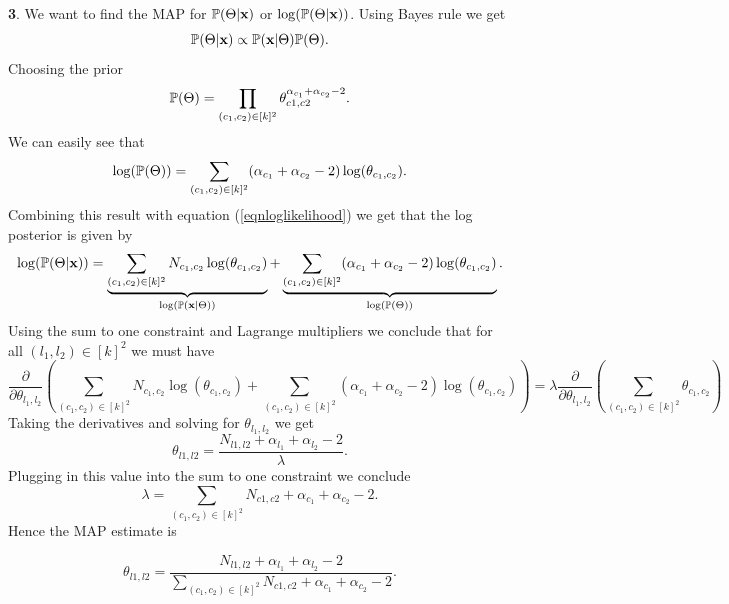 \documentclass{article}
\begin{document}
\textbf{3}. 
\newline
We want to find the MAP for $\mathbb{P}(\Theta|\textbf{x})$ or $\log(\mathbb{P}(\Theta|\textbf{x}))$. Using Bayes rule we get
\begin{equation*}
\mathbb{P}(\Theta|\textbf{x})\propto\mathbb{P}(\textbf{x}|\Theta)\mathbb{P}(\Theta).
\end{equation*}
Choosing the prior 
\begin{equation*}
\mathbb{P}(\Theta)=\prod_{(c_{1},c_{2})\in [k]^{2}}\theta_{c1,c2}^{\alpha_{c_{1}}+\alpha_{c_{2}}-2}.
\end{equation*}
We can easily see that 
\begin{equation*}
\log(\mathbb{P}(\Theta))=\sum_{(c_1,c_2)\in [k]^{2}}(\alpha_{c_{1}}+\alpha_{c_{2}}-2)\log(\theta_{c_1,c_2}).
\end{equation*}
Combining this result with equation (\ref{eqnloglikelihood}) we get that the log posterior is given by
\begin{equation*}
\log(\mathbb{P}(\Theta|\textbf{x}))=\underbrace{\sum_{(c_1,c_2)\in[k]^{2}}N_{c_1,c_2}\log(\theta_{c_1,c_2})}_{\log(\mathbb{P}(\textbf{x}|\Theta))}+
\underbrace{\sum_{(c_1,c_2)\in [k]^{2}}(\alpha_{c_{1}}+\alpha_{c_{2}}-2)\log(\theta_{c_1,c_2})}_{\log(\mathbb{P}(\Theta))}.
\end{equation*}
Using the sum to one constraint and Lagrange multipliers we conclude that for all $(l_{1},l_{2})\in [k]^{2}$ we must  have
\begin{equation*}
\frac{\partial}{\partial\theta_{l_1,l_2}}(\sum_{(c_1,c_2)\in[k]^{2}}N_{c_1,c_2}\log(\theta_{c_1,c_2})+
\sum_{(c_1,c_2)\in [k]^{2}}(\alpha_{c_{1}}+\alpha_{c_{2}}-2)\log(\theta_{c_1,c_2}))=
\lambda\frac{\partial}{\partial\theta_{l_1,l_2}}(\sum_{(c_1,c_2)\in [k]^{2}}\theta_{c_1,c_2})
\end{equation*}
Taking the derivatives and solving for $\theta_{l_1,l_2}$ we get
\begin{equation*}
\theta_{l1,l2}=\frac{N_{l1,l2} +\alpha_{l_{1}}+\alpha_{l_{2}}-2}{\lambda}.
\end{equation*}
Plugging in this value into the sum to one constraint we conclude
\begin{equation*}
\lambda=\sum_{(c_1,c_2)\in [k]^{2}}N_{c1,c2}+\alpha_{c_{1}}+\alpha_{c_{2}}-2.
\end{equation*}
Hence the MAP estimate is


\begin{equation*}
\theta_{l1,l2}=\frac{N_{l1,l2} +\alpha_{l_{1}}+\alpha_{l_{2}}-2}{\sum_{(c_1,c_2)\in [k]^{2}}N_{c1,c2}+\alpha_{c_{1}}+\alpha_{c_{2}}-2}.
\end{equation*}
\end{document}

